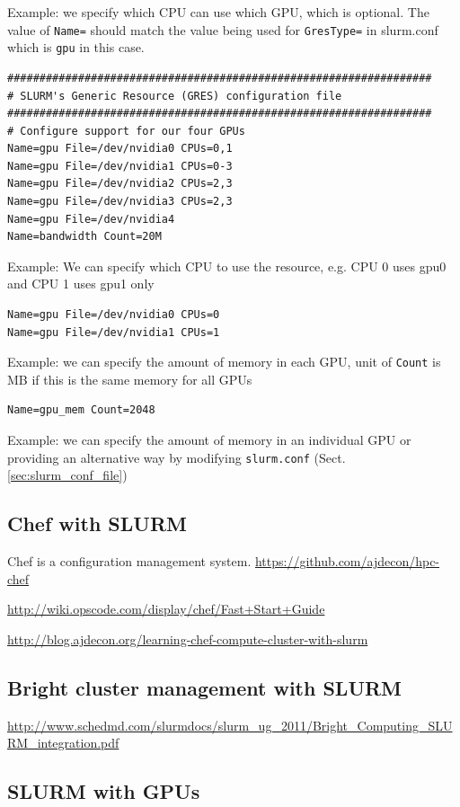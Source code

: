 Example: we specify which CPU can use which GPU, which is optional. The value of
\verb!Name=! should match the value being
used for \verb!GresType=! in slurm.conf which is \verb!gpu! in this case.
\begin{verbatim}
################################################################## 
# SLURM's Generic Resource (GRES) configuration file 
################################################################## 
# Configure support for our four GPUs 
Name=gpu File=/dev/nvidia0 CPUs=0,1 
Name=gpu File=/dev/nvidia1 CPUs=0-3
Name=gpu File=/dev/nvidia2 CPUs=2,3 
Name=gpu File=/dev/nvidia3 CPUs=2,3 
Name=gpu File=/dev/nvidia4
Name=bandwidth Count=20M
\end{verbatim}

Example: We can specify which CPU to use the resource, e.g. CPU 0 uses gpu0 and
CPU 1 uses gpu1 only
\begin{verbatim}
Name=gpu File=/dev/nvidia0 CPUs=0 
Name=gpu File=/dev/nvidia1 CPUs=1 
\end{verbatim}

Example: we can specify the amount of memory in each GPU, unit of \verb!Count!
is MB if this is the same memory for all GPUs
\begin{verbatim}
Name=gpu_mem Count=2048 
\end{verbatim}

Example: we can specify the amount of memory in an individual GPU or providing
an alternative way by modifying \verb!slurm.conf! (Sect.\ref{sec:slurm_conf_file})


\subsection{Chef with SLURM}

Chef is a configuration management system.
\url{https://github.com/ajdecon/hpc-chef}

\url{http://wiki.opscode.com/display/chef/Fast+Start+Guide}

\url{http://blog.ajdecon.org/learning-chef-compute-cluster-with-slurm}

\subsection{Bright cluster management with SLURM}

\url{http://www.schedmd.com/slurmdocs/slurm_ug_2011/Bright_Computing_SLURM_integration.pdf}

\subsection{SLURM with GPUs}
\label{sec:SLURM_GPU}

